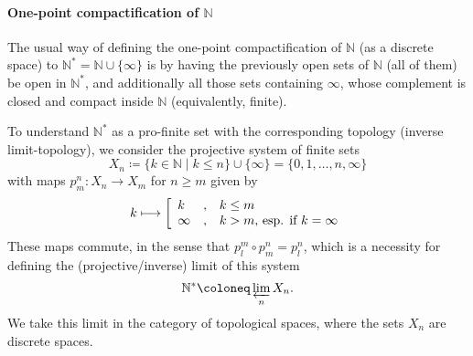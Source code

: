 \documentclass{notes}
\begin{document}
{\adrian
\paragraph{One-point compactification of $\mathbb N$}

The usual way of defining the one-point compactification of $\mathbb N$ (as a discrete space) to $\mathbb N^* = \mathbb N \cup \{\infty\}$ is by having the previously open sets of $\mathbb N$ (all of them) be open in $\mathbb N^*$, and additionally all those sets containing $\infty$, whose complement is closed and compact inside $\mathbb N$ (equivalently, finite).

To understand $\mathbb N^*$ as a pro-finite set with the corresponding topology (inverse limit-topology), we consider the projective system of finite sets
  \[
    X_n \coloneq \{ k \in \mathbb N \mid k \leq n\} \cup \{ \infty \} = \{0, 1, \dots, n, \infty\}
  \]
  with maps $p^{n}_m \colon X_{n} \longrightarrow X_{m}$ for $n \geq m$ given by
  \[
    k \longmapsto
    \left[
    \begin{array}{lll}
      k
      & ,
      & k \leq m
      \\  \infty
      & ,
      & \textup{$k > m$, esp. if $k = \infty$}
    \end{array}
    \right.
  \]
  These maps commute, in the sense that $p^m_l \circ p^n_m = p^n_l$, which is a necessity for defining the (projective/inverse) limit of this system
  \begin{equation}
    \label{def:compactified_IN}
    \mathbb N^* \coloneq \varprojlim_{n} X_n.
  \end{equation}
  We take this limit in the category of topological spaces, where the sets $X_n$ are discrete spaces.


}
\end{document}
